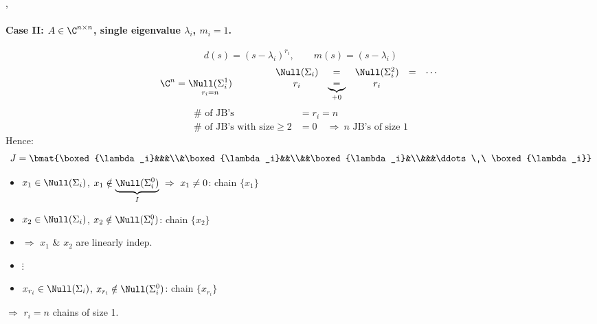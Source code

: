 \sep
\paragraph{Case II: $A\in\C^{n\times n}$, single eigenvalue $\lambda_i$, $m_i=1$.}
\[
d(s)=(s-\lambda_i)^{r_i},\qquad m(s)=(s-\lambda_i)
\]
\[
\C^n=\underset{r_i=n}{\Null(\Sigma_i^1)}
\qquad\qquad
\begin{array}{ccccc}
\Null(\Sigma_i)&=&\Null(\Sigma_i^2)&=&\cdots\\
r_i&\underbrace{=}_{+0}&r_i&&
\end{array}
\]
\begin{align*}
\#\text{ of JB's}&=r_i=n\\
\#\text{ of JB's with size}\geq 2&=0\quad\Rightarrow\ n\text{ JB's of size }1
\end{align*}
Hence:
\[
J=\bmat{\boxed{\lambda_i}&&&\\&\boxed{\lambda_i}&&\\&&\boxed{\lambda_i}&\\&&&\ddots\ \ \boxed{\lambda_i}}
\]

\begin{minipage}[c]{0.24\textwidth}
\centering
{}
\end{minipage}\hfill
\begin{minipage}[c]{0.73\textwidth}
\begin{itemize}[nosep,leftmargin=1em]
\item[] $x_1\in\Null(\Sigma_i)$, \quad $x_1\notin\underbrace{\Null(\Sigma_i^0)}_{I}\ \Rightarrow\ x_1\neq 0$: \quad chain $\{x_1\}$
\item[] $x_2\in\Null(\Sigma_i)$, \quad $x_2\notin\Null(\Sigma_i^0)$: \quad chain $\{x_2\}$
\item[] \qquad $\Rightarrow$ $x_1$ \& $x_2$ are linearly indep.
\item[] \quad$\vdots$
\item[] $x_{r_i}\in\Null(\Sigma_i)$, \quad $x_{r_i}\notin\Null(\Sigma_i^0)$: \quad chain $\{x_{r_i}\}$
\end{itemize}
$\Rightarrow$ $r_i=n$ chains of size 1.
\end{minipage}

